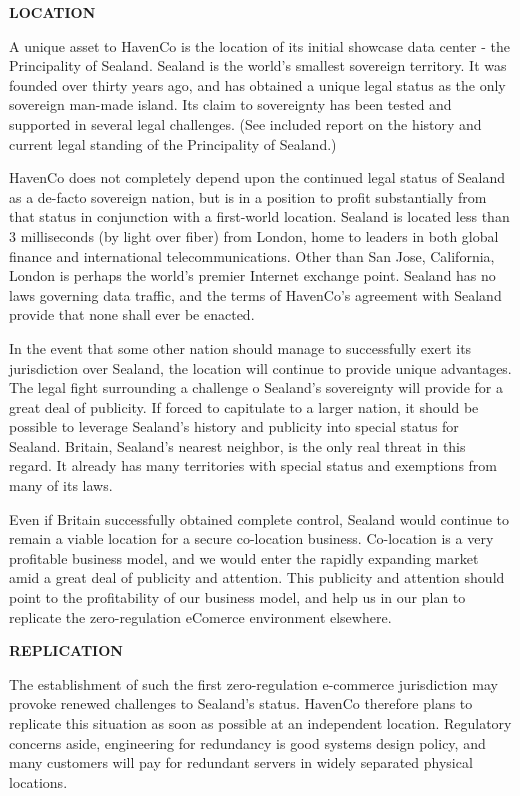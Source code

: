 \textbf{LOCATION}

A unique asset to HavenCo is the location of its initial showcase data center - the Principality of Sealand. Sealand is the world's smallest sovereign territory. It was founded over thirty years ago, and has obtained a unique legal status as the only sovereign man-made island. Its claim to sovereignty has been tested and supported in several legal challenges.  (See included report on the history and current legal standing of the Principality of Sealand.)

HavenCo does not completely depend upon the continued legal status of Sealand as a de-facto sovereign nation, but is in a position to profit substantially from that status in conjunction with a first-world location. Sealand is located less than 3 milliseconds (by light over fiber) from London, home to leaders in both global finance and international telecommunications. Other than San Jose, California, London is perhaps the world's premier Internet exchange point. Sealand has no laws governing data traffic, and the terms of HavenCo's agreement with Sealand provide that none shall ever be enacted.

In the event that some other nation should manage to successfully exert its jurisdiction over Sealand, the location will continue to provide unique advantages. The legal fight surrounding a challenge o Sealand's sovereignty will provide for a great deal of publicity. If forced to capitulate to a larger nation, it should be possible to leverage Sealand's history and publicity into special status for Sealand. Britain, Sealand's nearest neighbor, is the only real threat in this regard.  It already has many territories with special status and exemptions from many of its laws.

Even if Britain successfully obtained complete control, Sealand would continue to remain a viable location for a secure co-location business. Co-location is a very profitable business model, and we would enter the rapidly expanding market amid a great deal of publicity and attention. This publicity and attention should point to the profitability of our business model, and help us in our plan to replicate the zero-regulation eComerce environment elsewhere.

\textbf{REPLICATION}

The establishment of such the first zero-regulation e-commerce jurisdiction may provoke renewed challenges to Sealand's status. HavenCo therefore plans to replicate this situation as soon as possible at an independent location. Regulatory concerns aside, engineering for redundancy is good systems design policy, and many customers will pay for redundant servers in widely separated physical locations.

